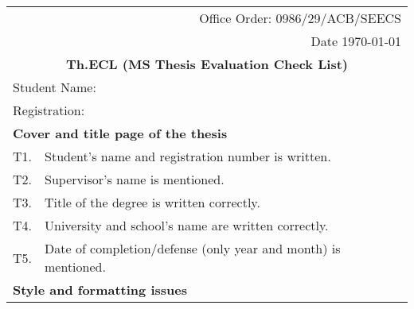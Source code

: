 \begin{table}[!ht]
\footnotesize
\begin{adjustbox}{width=\linewidth,center}
\begin{tabular}{p{0.6cm}p{9cm}p{0.6cm}}
\multicolumn{3}{r}{Office Order: 0986/29/ACB/SEECS} \\
\multicolumn{3}{r}{Date  \today}                                          \\
\multicolumn{3}{c}{\textbf{Th.ECL (MS Thesis   Evaluation Check List)}}   \\\midrule
\multicolumn{3}{|l|}{Student  Name:}                                                                                                                                                     \\ \midrule
\multicolumn{3}{|l|}{Registration:}                                                                                                                                                      \\ \midrule
\multicolumn{3}{|l|}{\textbf{Cover and title   page of the thesis}}                                                                                                                      \\ \midrule
\multicolumn{1}{|l|}{T1.} & \multicolumn{1}{l|}{Student's name and registration   number is written.}                                                            & \multicolumn{1}{l|}{} \\ \midrule
\multicolumn{1}{|l|}{T2.} & \multicolumn{1}{l|}{Supervisor's name is   mentioned.}                                                                               & \multicolumn{1}{l|}{} \\ \midrule
\multicolumn{1}{|l|}{T3.} & \multicolumn{1}{l|}{Title of the degree   is written correctly.}                                                                     & \multicolumn{1}{l|}{} \\ \midrule
\multicolumn{1}{|l|}{T4.} & \multicolumn{1}{l|}{University and   school's name are written correctly.}                                                           & \multicolumn{1}{l|}{} \\ \midrule
\multicolumn{1}{|l|}{T5.} & \multicolumn{1}{l|}{Date of   completion/defense (only year and month) is mentioned.}                                                & \multicolumn{1}{l|}{} \\ \midrule
\multicolumn{3}{|l|}{\textbf{Style and formatting issues}}                                                                                                                               \\ \midrule

\end{tabular}
\end{adjustbox}
\end{table}
